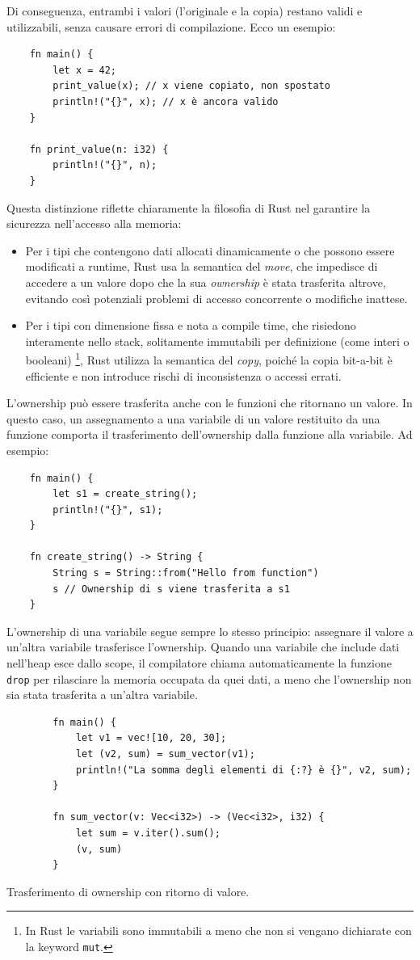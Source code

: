 Di conseguenza, entrambi i valori (l'originale e la copia) restano validi e utilizzabili, senza causare errori di compilazione. Ecco un esempio:
\begin{verbatim}
    fn main() {
        let x = 42;
        print_value(x); // x viene copiato, non spostato
        println!("{}", x); // x è ancora valido
    }

    fn print_value(n: i32) {
        println!("{}", n);
    }
\end{verbatim}
Questa distinzione riflette chiaramente la filosofia di Rust nel garantire la sicurezza nell'accesso alla memoria:
\begin{itemize}
    \item Per i tipi che contengono dati allocati dinamicamente o che possono essere modificati a runtime, Rust usa la semantica del \textit{move}, che impedisce di accedere a un valore dopo che la sua \textit{ownership} è stata trasferita altrove, evitando così potenziali problemi di accesso concorrente o modifiche inattese.
    \item Per i tipi con dimensione fissa e nota a compile time, che risiedono interamente nello stack, solitamente immutabili per definizione (come interi o booleani) \footnote{In Rust le variabili sono immutabili a meno che non si vengano dichiarate con la keyword \texttt{mut}.}, Rust utilizza la semantica del \textit{copy}, poiché la copia bit-a-bit è efficiente e non introduce rischi di inconsistenza o accessi errati.
\end{itemize}
L'ownership può essere trasferita anche con le funzioni che ritornano un valore. In questo caso, un assegnamento a una variabile di un valore restituito da una funzione comporta il trasferimento dell'ownership dalla funzione alla variabile. Ad esempio:
\begin{verbatim}
    fn main() {
        let s1 = create_string(); 
        println!("{}", s1);
    }

    fn create_string() -> String {
        String s = String::from("Hello from function")
        s // Ownership di s viene trasferita a s1
    }
\end{verbatim}
L'ownership di una variabile segue sempre lo stesso principio: assegnare il valore a un'altra variabile trasferisce l'ownership. Quando una variabile che include dati nell'heap esce dallo scope, il compilatore chiama automaticamente la funzione \texttt{drop} per rilasciare la memoria occupata da quei dati, a meno che l'ownership non sia stata trasferita a un'altra variabile.
\begin{listing}[H]
    \begin{verbatim}
        fn main() {
            let v1 = vec![10, 20, 30];
            let (v2, sum) = sum_vector(v1); 
            println!("La somma degli elementi di {:?} è {}", v2, sum);
        }

        fn sum_vector(v: Vec<i32>) -> (Vec<i32>, i32) {
            let sum = v.iter().sum();
            (v, sum)
        }
    \end{verbatim}
    \caption{Trasferimento di ownership con ritorno di valore.}
    \label{lst:ownership-return}
\end{listing}

